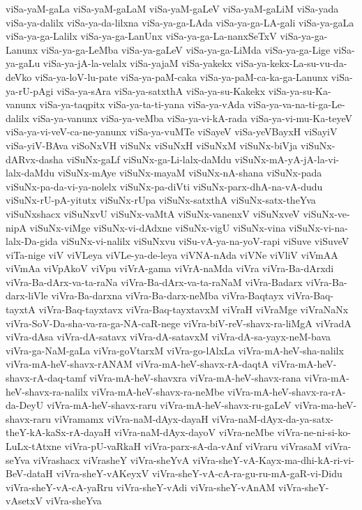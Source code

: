 {viSa-yaM-gaLa
viSa-yaM-gaLaM
viSa-yaM-gaLeV
viSa-yaM-gaLiM
viSa-yada
viSa-ya-dalilx
viSa-ya-da-lilxna
viSa-ya-ga-LAda
viSa-ya-ga-LA-gali
viSa-ya-gaLa
viSa-ya-ga-Lalilx
viSa-ya-ga-LanUnx
viSa-ya-ga-La-nanxSeTxV
viSa-ya-ga-Lanunx
viSa-ya-ga-LeMba
viSa-ya-gaLeV
viSa-ya-ga-LiMda
viSa-ya-ga-Lige
viSa-ya-gaLu
viSa-ya-jA-la-velalx
viSa-yajaM
viSa-yakekx
viSa-ya-kekx-La-su-vu-da-deVko
viSa-ya-loV-lu-pate
viSa-ya-paM-caka
viSa-ya-paM-ca-ka-ga-Lanunx
viSa-ya-rU-pAgi
viSa-ya-sAra
viSa-ya-satxthA
viSa-ya-su-Kakekx
viSa-ya-su-Ka-vanunx
viSa-ya-taqpitx
viSa-ya-ta-ti-yana
viSa-ya-vAda
viSa-ya-va-na-ti-ga-Le-dalilx
viSa-ya-vanunx
viSa-ya-veMba
viSa-ya-vi-kA-rada
viSa-ya-vi-mu-Ka-teyeV
viSa-ya-vi-veV-ca-ne-yanunx
viSa-ya-vuMTe
viSayeV
viSa-yeVBayxH
viSayiV
viSa-yiV-BAva
viSoNxVH
viSuNx
viSuNxH
viSuNxM
viSuNx-biVja
viSuNx-dARvx-dasha
viSuNx-gaLf
viSuNx-ga-Li-lalx-daMdu
viSuNx-mA-yA-jA-la-vi-lalx-daMdu
viSuNx-mAye
viSuNx-mayaM
viSuNx-nA-shana
viSuNx-pada
viSuNx-pa-da-vi-ya-nolelx
viSuNx-pa-diVti
viSuNx-parx-dhA-na-vA-dudu
viSuNx-rU-pA-yitutx
viSuNx-rUpa
viSuNx-satxthA
viSuNx-satx-theYva
viSuNxshacx
viSuNxvU
viSuNx-vaMtA
viSuNx-vanenxV
viSuNxveV
viSuNx-ve-nipA
viSuNx-viMge
viSuNx-vi-dAdxne
viSuNx-vigU
viSuNx-vina
viSuNx-vi-na-lalx-Da-gida
viSuNx-vi-nalilx
viSuNxvu
viSu-vA-ya-na-yoV-rapi
viSuve
viSuveV
viTa-nige
viV
viVLeya
viVLe-ya-de-leya
viVNA-nAda
viVNe
viVliV
viVmAA
viVmAa
viVpAkoV
viVpu
viVrA-gama
viVrA-naMda
viVra
viVra-Ba-dArxdi
viVra-Ba-dArx-va-ta-raNa
viVra-Ba-dArx-va-ta-raNaM
viVra-Badarx
viVra-Ba-darx-liVle
viVra-Ba-darxna
viVra-Ba-darx-neMba
viVra-Baqtayx
viVra-Baq-tayxtA
viVra-Baq-tayxtavx
viVra-Baq-tayxtavxM
viVraH
viVraMge
viVraNaNx
viVra-SoV-Da-sha-va-ra-ga-NA-caR-nege
viVra-biV-reV-shavx-ra-liMgA
viVradA
viVra-dAsa
viVra-dA-satavx
viVra-dA-satavxM
viVra-dA-sa-yayx-neM-bava
viVra-ga-NaM-gaLa
viVra-goVtarxM
viVra-go-lAlxLa
viVra-mA-heV-sha-nalilx
viVra-mA-heV-shavx-rANAM
viVra-mA-heV-shavx-rA-daqtA
viVra-mA-heV-shavx-rA-daq-tamf
viVra-mA-heV-shavxra
viVra-mA-heV-shavx-rana
viVra-mA-heV-shavx-ra-nalilx
viVra-mA-heV-shavx-ra-neMbe
viVra-mA-heV-shavx-ra-rA-da-DeyU
viVra-mA-heV-shavx-raru
viVra-mA-heV-shavx-ru-gaLeV
viVra-ma-heV-shavx-raru
viVramamx
viVra-naM-dAyx-dayaH
viVra-naM-dAyx-da-ya-satx-theY-kA-kaSx-rA-dayaH
viVra-naM-dAyx-dayoV
viVra-neMbe
viVra-ne-ni-si-ko-LuLx-tAtxne
viVra-pU-vaRkaH
viVra-parx-sA-da-vAnf
viVraru
viVrasaM
viVra-seYva
viVrashacx
viVrasheY
viVra-sheYvA
viVra-sheY-vA-Kayx-ma-dhi-kA-ri-vi-BeV-dataH
viVra-sheY-vAKeyxV
viVra-sheY-vA-cA-ra-gu-ru-mA-gaR-vi-Didu
viVra-sheY-vA-cA-yaRru
viVra-sheY-vAdi
viVra-sheY-vAnAM
viVra-sheY-vAsetxV
viVra-sheYva
}
